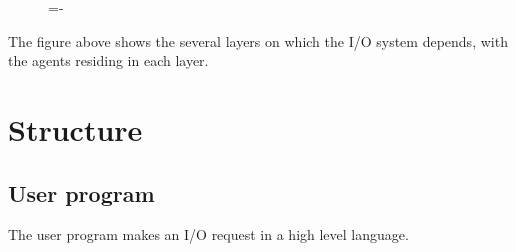 \documentclass[a4paper]{systems-software}
\begin{document}
\begin{figure}[H]
  \lineskip=-\fboxrule
\end{figure}

The figure above shows the several layers on which the I/O system depends, with the agents residing in each layer.


\newpage

\section*{Structure}

\subsection*{User program}

The user program makes an I/O request in a high level language.
\end{document}
